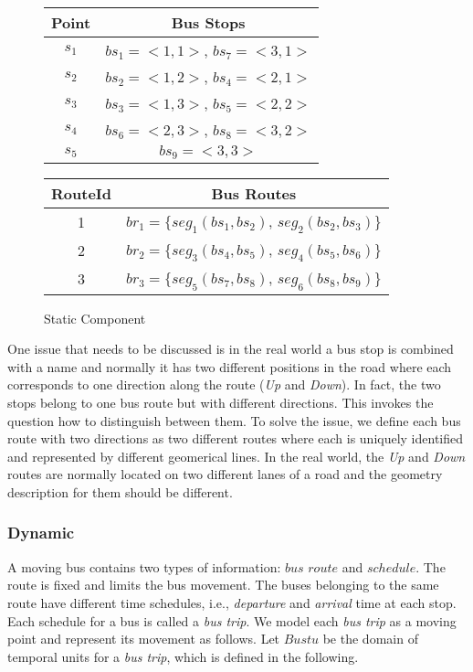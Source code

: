 \begin{figure}[htb]
\centering
\subfigure
  {\begin{tabular}{c|c}
	\hline
    Point& Bus Stops\\
	\hline
	$s_1$& $bs_1=<1,1>$, $bs_7=<3,1>$\\
	\hline
	$s_2$&  $bs_2=<1,2>$, $bs_4=<2,1>$\\
	\hline
	$s_3$ & $bs_3=<1,3>$, $bs_5=<2,2>$\\
	\hline
	$s_4$ & $bs_6=<2,3>$, $bs_8=<3,2>$\\
	\hline
	$s_5$ & $bs_9=<3,3>$\\
	\hline
  \end{tabular}
}
\hspace{1cm}
\subfigure
  {\begin{tabular}{c|c}
	\hline
    RouteId & Bus Routes\\
	\hline
	1 & $br_1=\{seg_1(bs_1,bs_2)$, $seg_2(bs_2,bs_3)\}$\\
	\hline
	2 & $br_2=\{seg_3(bs_4,bs_5)$, $seg_4(bs_5,bs_6)\}$\\
	\hline
	3 & $br_3=\{seg_5(bs_7,bs_8)$, $seg_6(bs_8,bs_9)\}$\\
	\hline
  \end{tabular}
}
 \caption{\label{tab:busrouteandstop}Static Component}
\end{figure}

One issue that needs to be discussed is in the real world a bus stop is combined with a name and 
normally it has two different positions in the road where each corresponds to one direction 
along the route (\textit{Up} and \textit{Down}). 
In fact, the two stops belong to one bus route but with 
different directions. This invokes the question how to distinguish between them. 
To solve the issue, we define each bus route with two directions as two 
different routes where each is uniquely identified and represented by different geomerical lines.
In the real world, the \textit{Up} and \textit{Down} routes are normally located on two different
lanes of a road and the geometry description for them should be different. 

\subsubsection{Dynamic}
\label{sec:dynamic}
A moving bus contains two types of information: $bus$ $route$ and $schedule$. The route
is fixed and limits the bus movement. The buses belonging to the same 
route have different time schedules, i.e., \textit{departure} and \textit{arrival} time at each stop. 
Each schedule for a bus is called a \textit{bus trip}. 
We model each \textit{bus trip} as a moving point and represent
its movement as follows. Let $Bustu$ be the domain of temporal units for a \textit{bus trip}, which is defined in the following. 


